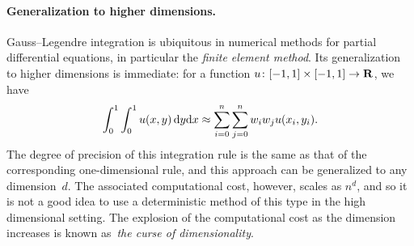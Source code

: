 \paragraph{Generalization to higher dimensions.}
Gauss--Legendre integration is ubiquitous in numerical methods for partial differential equations,
in particular the \emph{finite element method}.
Its generalization to higher dimensions is immediate:
for a function $u\colon [-1, 1] \times [-1, 1] \to \mathbf R$,
we have
\[
    \int_{0}^{1} \int_{0}^{1} u(x, y) \, \mathrm d y \mathrm d x \approx \sum_{i=0}^{n} \sum_{j=0}^{n} w_i w_j u(x_i, y_i).
\]
The degree of precision of this integration rule is the same as
that of the corresponding one-dimensional rule,
and this approach can be generalized to any dimension~$d$.
The associated computational cost,
however, scales as $n^d$,
and so it is not a good idea to use a deterministic method of this type in the high dimensional setting.
The explosion of the computational cost as the dimension increases is known as~\emph{the curse of dimensionality}.


